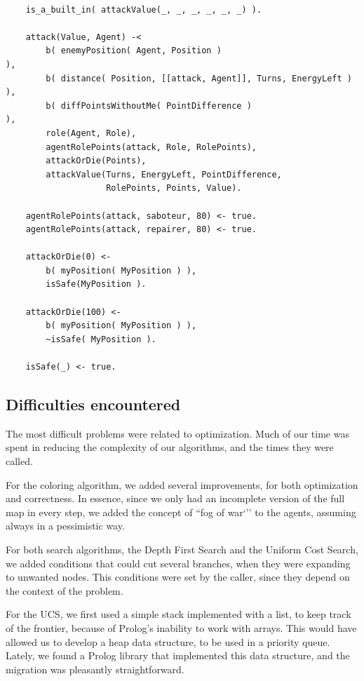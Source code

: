     \begin{small}
    \begin{verbatim}

    is_a_built_in( attackValue(_, _, _, _, _, _) ).

    attack(Value, Agent) -<
        b( enemyPosition( Agent, Position )                           ),
        b( distance( Position, [[attack, Agent]], Turns, EnergyLeft ) ),
        b( diffPointsWithoutMe( PointDifference )                     ),
        role(Agent, Role),
        agentRolePoints(attack, Role, RolePoints),
        attackOrDie(Points),
        attackValue(Turns, EnergyLeft, PointDifference, 
                    RolePoints, Points, Value).
        
    agentRolePoints(attack, saboteur, 80) <- true.
    agentRolePoints(attack, repairer, 80) <- true.

    attackOrDie(0) <- 
        b( myPosition( MyPosition ) ),
        isSafe(MyPosition ).

    attackOrDie(100) <- 
        b( myPosition( MyPosition ) ),
        ~isSafe( MyPosition ).  

    isSafe(_) <- true.
    \end{verbatim}
    \end{small}

\subsection{Difficulties encountered}
    The most difficult problems were related to optimization. Much of our time was 
    spent in reducing the complexity of our algorithms, and the times they 
    were called.

    For the coloring algorithm, we added several improvements, for both 
    optimization and correctness. In essence, since we only had an incomplete 
    version of the full map in every step, we added the concept of ``fog of war`'' 
    to the agents, assuming always in a pessimistic way. 

    For both search algorithms, the Depth First Search and the Uniform Cost 
    Search, we added conditions that could cut several branches, when they were 
    expanding to unwanted nodes. This conditions were set by the caller, since 
    they depend on the context of the problem.

    For the UCS, we first used a simple stack implemented with a list, to keep 
    track of the frontier, because of Prolog's inability to work with arrays. This 
    would have allowed us to develop a heap data structure, to be used in a 
    priority queue. Lately, we found a Prolog library that implemented this data 
    structure, and the migration was pleasantly straightforward.

